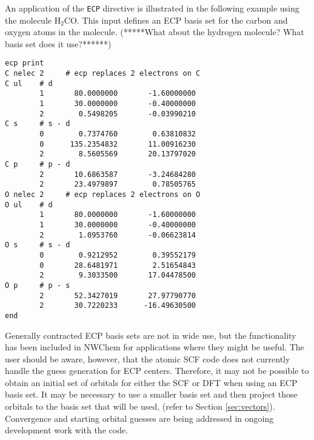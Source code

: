 An application of the \verb+ECP+ directive is illustrated in the following 
example using the molecule  H$_2$CO.  This input defines an ECP basis set 
for the  carbon and oxygen atoms in the molecule.
\Large
(*****What about the hydrogen molecule?  What basis set does it use?******)
\normalsize



\begin{verbatim}
ecp print  
C nelec 2     # ecp replaces 2 electrons on C
C ul    # d
        1       80.0000000       -1.60000000
        1       30.0000000       -0.40000000
        2        0.5498205       -0.03990210
C s     # s - d 
        0        0.7374760        0.63810832
        0      135.2354832       11.00916230
        2        8.5605569       20.13797020
C p     # p - d
        2       10.6863587       -3.24684280
        2       23.4979897        0.78505765
O nelec 2     # ecp replaces 2 electrons on O
O ul    # d 
        1       80.0000000       -1.60000000
        1       30.0000000       -0.40000000
        2        1.0953760       -0.06623814
O s     # s - d
        0        0.9212952        0.39552179
        0       28.6481971        2.51654843
        2        9.3033500       17.04478500
O p     # p - s 
        2       52.3427019       27.97790770
        2       30.7220233      -16.49630500
end
\end{verbatim}

Generally contracted ECP basis sets are not in wide use, but the
functionality has been included in NWChem for applications where
they might be useful.  The user should be aware, however, that
the atomic SCF code does not currently handle the guess
generation for ECP centers.  Therefore, it may not be possible to obtain
an initial set of orbitals for either the SCF or DFT when using an ECP
basis set.  It may be necessary to use a smaller basis set and then
project those orbitals to the
basis set that will be used, (refer to Section \ref{sec:vectors}).  Convergence
and starting orbital guesses are being addressed in ongoing development
work with the code.
